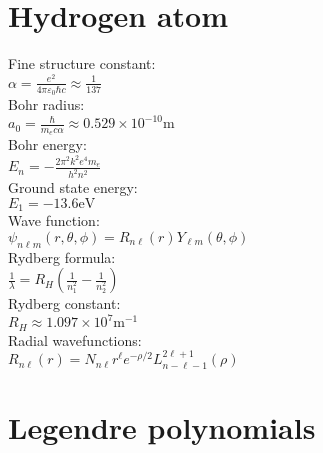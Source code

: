 \documentclass[12pt,a4paper]{article}
\begin{document}
\section*{Hydrogen atom}
\begin{center}
	Fine structure constant:\\[.15in]
	$\alpha = \frac{e^2}{4\pi \varepsilon_0 \hbar c} \approx \frac{1}{137}$\\[.15in]
	Bohr radius:\\[.15in]
	$a_0 = \frac{\hbar}{m_e c \alpha} \approx 0.529 \times 10^{-10} \text{m}$\\[.15in]
	Bohr energy:\\[.15in]
	$E_n = -\frac{2\pi^2 k^2 e^4 m_e}{h^2 n^2}$\\[.15in]
	Ground state energy:\\[.15in]
	$E_1 = -13.6 \text{eV}$\\[.15in]
	Wave function:\\[.15in]
	$\psi_{n\ell m}(r, \theta, \phi) = R_{n\ell}(r) Y_{\ell m}(\theta, \phi)$\\[.15in]
	Rydberg formula:\\[.15in]
	$\frac{1}{\lambda} = R_H \left( \frac{1}{n_1^2} - \frac{1}{n_2^2} \right)$\\[.15in]
	Rydberg constant:\\[.15in]
	$R_H \approx 1.097 \times 10^7 \text{m}^{-1}$\\[.15in]
	Radial wavefunctions:\\[.15in]
	$R_{n\ell}(r) = N_{n\ell} r^\ell e^{-\rho/2} L^{2\ell + 1}_{n-\ell-1}(\rho)$\\[.15in]
	
\end{center}


\section*{Legendre polynomials}
\end{document}
